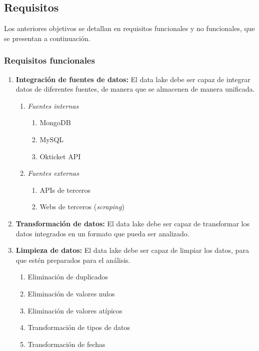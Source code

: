 \subsection{Requisitos}\label{subsec:requisitos}
Los anteriores objetivos se detallan en requisitos funcionales y no funcionales, que se
presentan a continuación.

\subsubsection{Requisitos funcionales}\label{subsubsec:funcionales}
\begin{enumerate}[label=RF\arabic*.]
	\item \textbf{Integración de fuentes de datos:} El data lake debe ser capaz de integrar datos
		de diferentes fuentes, de manera que se almacenen de manera unificada.
		\begin{enumerate}[label*=\arabic*.]
			\item \emph{Fuentes internas} \begin{enumerate}[label*=\arabic*.]
					\item MongoDB
					\item MySQL
					\item Okticket API
				\end{enumerate}
			\item \emph{Fuentes externas} \begin{enumerate}[label*=\arabic*.]
					\item APIs de terceros
					\item Webs de terceros (\textit{scraping})
				\end{enumerate}
		\end{enumerate}
	\item \textbf{Transformación de datos:} El data lake debe ser capaz de transformar los datos
		integrados en un formato que pueda ser analizado.
	\item \textbf{Limpieza de datos:} El data lake debe ser capaz de limpiar los datos, para que
		estén preparados para el análisis. \begin{enumerate}[label*=\arabic*.]
			\item Eliminación de duplicados
			\item Eliminación de valores nulos
			\item Eliminación de valores atípicos
			\item Transformación de tipos de datos
			\item Transformación de fechas
		\end{enumerate}

\end{enumerate}
